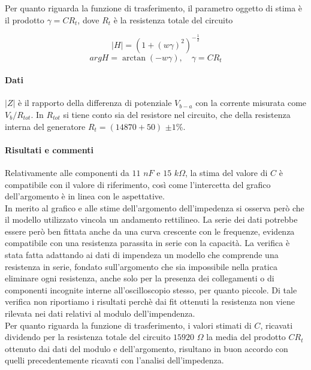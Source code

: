 
Per quanto riguarda la funzione di trasferimento, il parametro oggetto di stima è il prodotto $ \gamma = CR_{t} $, dove $ R_{t} $ è la resistenza totale del circuito

$$ |H| = ( 1 + (w\gamma)^{2} )^{-\frac{1}{2}} $$
$$ arg H = \arctan( -w\gamma ), \quad \gamma = CR_{t}$$


\paragraph{Dati} $ |Z| $ è il rapporto della differenza di potenziale $  V_{b-a} $ con la corrente misurata come $ V_{b} / R_{tot} $. In $ R_{tot} $ si tiene conto sia del resistore nel circuito, che della resistenza interna del generatore 
$ R_{t} = (14870 + 50) $ $\pm 1\%$.

\break
\paragraph{Risultati e commenti}
%
Relativamente alle componenti da $11$ $nF$ e $15$ $k\Omega$, la stima del valore di $C$ è compatibile con il valore di riferimento, così come l'intercetta del grafico dell'argomento è in linea con le aspettative.\\
%
In merito al grafico e alle stime dell'argomento dell'impedenza si osserva però che il modello utilizzato vincola un andamento rettilineo. La serie dei dati potrebbe essere però ben fittata anche da una curva crescente con le frequenze, evidenza compatibile con una resistenza parassita in serie con la capacità. La verifica è stata fatta adattando ai dati di impendeza un modello che comprende una resistenza in serie,  fondato sull'argomento che sia impossibile nella pratica eliminare ogni resistenza, anche solo per la presenza dei collegamenti o di componenti incognite interne all'oscilloscopio stesso, per quanto piccole. Di tale verifica non riportiamo i risultati perchè dai fit ottenuti la resistenza non viene rilevata nei dati relativi al modulo dell'impendenza.\\
%
Per quanto riguarda la funzione di trasferimento, i valori stimati di $C$, ricavati dividendo per la resistenza totale del circuito $15920$ $\Omega$ la media del prodotto $CR_{t}$ ottenuto dai dati del modulo e dell'argomento, risultano in buon accordo con quelli precedentemente ricavati con l'analisi dell'impedenza.\\
%
%



